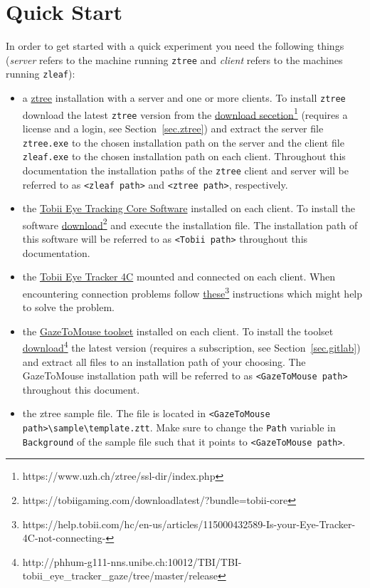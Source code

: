\documentclass[a4paper,oneside]{book}
\begin{document}
\chapter{Quick Start}
\label{sec.quick}
In order to get started with a quick experiment you need the following things (\emph{server} refers to the machine running \texttt{ztree} and \emph{client} refers to the machines running \texttt{zleaf}):
\begin{itemize}
    \item a \href{http://www.ztree.uzh.ch/en.html}{ztree} installation with a server and one or more clients.
        To install \texttt{ztree} download the latest \texttt{ztree} version from the \href{https://www.uzh.ch/ztree/ssl-dir/index.php}{download secetion}\footnote{https://www.uzh.ch/ztree/ssl-dir/index.php} (requires a license and a login, see Section~\ref{sec.ztree}) and extract the server file \texttt{ztree.exe} to the chosen installation path on the server and the client file \texttt{zleaf.exe} to the chosen installation path on each client.
        Throughout this documentation the installation paths of the \texttt{ztree} client and server will be referred to as \texttt{<zleaf path>} and \texttt{<ztree path>}, respectively.
    \item the \href{https://tobiigaming.com/getstarted/}{Tobii Eye Tracking Core Software} installed on each client.
        To install the software \href{https://tobiigaming.com/downloadlatest/?bundle=tobii-core}{download}\footnote{https://tobiigaming.com/downloadlatest/?bundle=tobii-core} and execute the installation file.
        The installation path of this software will be referred to as \texttt{<Tobii path>} throughout this documentation.
    \item the \href{https://tobiigaming.com/eye-tracker-4c/}{Tobii Eye Tracker 4C} mounted and connected on each client.
        When encountering connection problems follow \href{https://help.tobii.com/hc/en-us/articles/115000432589-Is-your-Eye-Tracker-4C-not-connecting-}{these}\footnote{https://help.tobii.com/hc/en-us/articles/115000432589-Is-your-Eye-Tracker-4C-not-connecting-} instructions which might help to solve the problem.
    \item the \href{http://phhum-g111-nns.unibe.ch:10012/TBI/TBI-tobii_eye_tracker_gaze}{GazeToMouse toolset} installed on each client.
        To install the toolset \href{http://phhum-g111-nns.unibe.ch:10012/TBI/TBI-tobii_eye_tracker_gaze/tree/master/release}{download}\footnote{http://phhum-g111-nns.unibe.ch:10012/TBI/TBI-tobii\_eye\_tracker\_gaze/tree/master/release} the latest version (requires a subscription, see Section~\ref{sec.gitlab}) and extract all files to an installation path of your choosing.
        The GazeToMouse installation path will be referred to as \texttt{<GazeToMouse path>} throughout this document.
    \item the ztree sample file.
        The file is located in \texttt{<GazeToMouse path>\textbackslash sample\textbackslash template.ztt}.
        Make sure to change the \texttt{Path} variable in \texttt{Background} of the sample file such that it points to \texttt{<GazeToMouse path>}.
\end{itemize}
\end{document}
